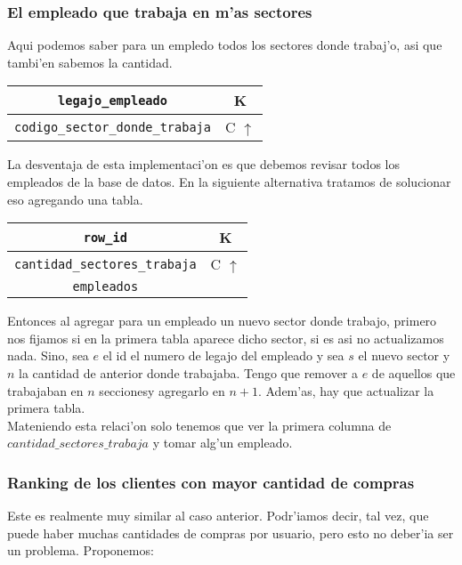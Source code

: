\subsubsection{El empleado que trabaja en m'as sectores}

Aqui podemos saber para un empledo todos los sectores donde trabaj'o, 
asi que tambi'en sabemos la cantidad.

\begin{center}
\begin{tabular}{|c|c|}
\hline
\texttt{legajo\_empleado} & K\\
\hline
\texttt{codigo\_sector\_donde\_trabaja} & C $\uparrow$\\
\hline
\end{tabular}
\end{center}

La desventaja de esta implementaci'on
es que debemos revisar todos los empleados de la base de datos. En la
siguiente alternativa tratamos de solucionar eso agregando una tabla.

\begin{center}
\begin{tabular}{|c|c|}
\hline
\texttt{row\_id} & K\\
\hline
\texttt{cantidad\_sectores\_trabaja} & C $\uparrow$\\
\hline
\texttt{empleados} & \\
\hline
\end{tabular}
\end{center}

Entonces al agregar para un empleado un nuevo sector donde trabajo, 
primero nos fijamos si en la primera tabla aparece dicho sector, si es asi
no actualizamos nada. Sino, sea $e$ el id el numero de legajo del empleado
y sea $s$ el nuevo sector y $n$ la cantidad de anterior donde trabajaba.
Tengo que remover a $e$ de aquellos que trabajaban en $n$ seccionesy agregarlo en
$n+1$. Adem'as, hay que actualizar la primera tabla.\\

Mateniendo esta relaci'on solo tenemos que ver la primera columna de 
$cantidad\_sectores\_trabaja$ y tomar alg'un empleado.


\subsubsection{Ranking de los clientes con mayor cantidad de compras}

Este es realmente muy similar al caso anterior. Podr'iamos decir, tal vez, 
que puede haber muchas cantidades de compras por usuario, pero esto no deber'ia
ser un problema. Proponemos:

